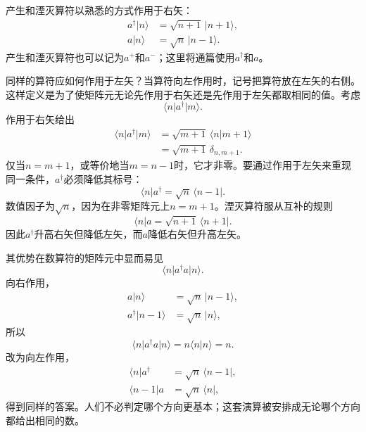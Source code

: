 产生和湮灭算符以熟悉的方式作用于右矢：
\begin{align}
a^\dagger\lvert n\rangle&=\sqrt{n+1}\,\lvert n+1\rangle,\\
a\lvert n\rangle&=\sqrt n\,\lvert n-1\rangle.
\end{align}
产生和湮灭算符也可以记为\(a^+\)和\(a^-\)；这里将通篇使用\(a^\dagger\)和\(a\)。

同样的算符应如何作用于左矢？当算符向左作用时，记号把算符放在左矢的右侧。这样定义是为了使矩阵元无论先作用于右矢还是先作用于左矢都取相同的值。考虑
\begin{equation}
\langle n\rvert a^\dagger\lvert m\rangle.
\end{equation}
作用于右矢给出
\begin{align}
\langle n\rvert a^\dagger\lvert m\rangle
&=\sqrt{m+1}\,\langle n\vert m+1\rangle\\
&=\sqrt{m+1}\,\delta_{n,m+1}.
\end{align}
仅当\(n=m+1\)，或等价地当\(m=n-1\)时，它才非零。要通过作用于左矢来重现同一条件，\(a^\dagger\)必须降低其标号：
\begin{equation}
\langle n\rvert a^\dagger
=\sqrt n\,\langle n-1\rvert.
\end{equation}
数值因子为\(\sqrt n\)，因为在非零矩阵元上\(n=m+1\)。湮灭算符服从互补的规则
\begin{equation}
\langle n\rvert a
=\sqrt{n+1}\,\langle n+1\rvert.
\end{equation}
因此\(a^\dagger\)升高右矢但降低左矢，而\(a\)降低右矢但升高左矢。

其优势在数算符的矩阵元中显而易见
\begin{equation}
\langle n\rvert a^\dagger a\lvert n\rangle.
\end{equation}
向右作用，
\begin{align}
a\lvert n\rangle&=\sqrt n\,\lvert n-1\rangle,\\
a^\dagger\lvert n-1\rangle&=\sqrt n\,\lvert n\rangle,
\end{align}
所以
\begin{equation}
\langle n\rvert a^\dagger a\lvert n\rangle
=n\langle n\vert n\rangle=n.
\end{equation}
改为向左作用，
\begin{align}
\langle n\rvert a^\dagger&=\sqrt n\,\langle n-1\rvert,\\
\langle n-1\rvert a&=\sqrt n\,\langle n\rvert,
\end{align}
得到同样的答案。人们不必判定哪个方向更基本；这套演算被安排成无论哪个方向都给出相同的数。


